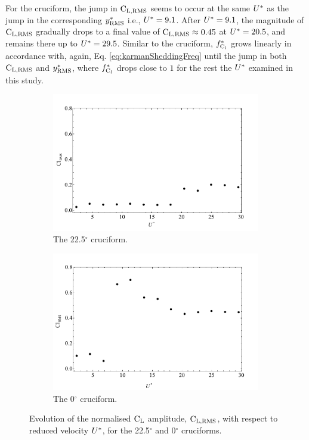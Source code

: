 \documentclass[oneside]{utmthesis}
\begin{document}
For the \angon{} cruciform, the jump in $\text{C}_{\text{L,RMS}}$ seems to occur at the same $U^{*}$ as the jump in the corresponding $y^{*}_{\text{RMS}}$ i.e., $U^{*} = 9.1$. After $U^{*} = 9.1$, the magnitude of $\text{C}_{\text{L,RMS}}$ gradually drops to a final value of $\text{C}_{\text{L,RMS}} \approx 0.45$ at $U^{*} = 20.5$, and remains there up to $U^{*} = 29.5$. Similar to the \angtw{} cruciform, $f_{\text{C}_{l}}^{*}$ grows linearly in accordance with, again, Eq. \ref{eq:karmanSheddingFreq} until the jump in both $\text{C}_{\text{L,RMS}}$ and $y^{*}_{\text{RMS}}$, where $f_{\text{C}_{l}}^{*}$ drops close to $1$ for the rest the $U^{*}$ examined in this study.

\begin{figure}
  \centering
  \begin{subfigure}[h]{1\textwidth}
    \includegraphics[width=\textwidth]{figs/clRMS2}
    \caption{The 22.5$^{\circ}$ cruciform.}
    \label{fig:clRMS2}
  \end{subfigure}
  
  \begin{subfigure}[h]{1\textwidth}
    \includegraphics[width=\textwidth]{figs/clRMS1}
    \caption{The 0$^{\circ}$ cruciform.}
    \label{fig:clRMS1}
  \end{subfigure}

  \label{fig:clRMS21}
  \caption{Evolution of the normalised $\text{C}_{\text{L}}$ \rms{} amplitude, $\text{C}_{\text{L,RMS}}$, with respect to reduced velocity $U^{*}$, for the 22.5$^{\circ}$ and 0$^{\circ}$ cruciforms.}
\end{figure}
\end{document}
